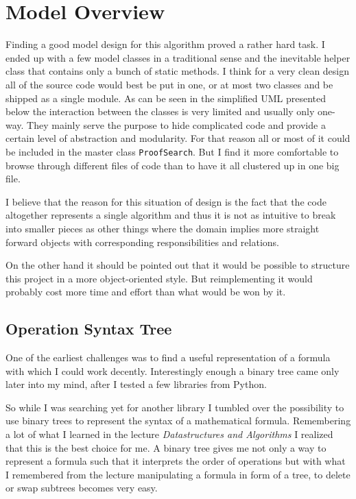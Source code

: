 \section{Model Overview}
Finding a good model design for this algorithm proved a rather hard task. I ended up with a few model classes in a traditional sense and the inevitable helper class that contains only a bunch of static methods. I think for a very clean design all of the source code would best be put in one, or at most two classes and be shipped as a single module. As can be seen in the simplified UML presented below the interaction between the classes is very limited and usually only one-way. They mainly serve the purpose to hide complicated code and provide a certain level of abstraction and modularity. For that reason all or most of it could be included in the master class \texttt{ProofSearch}. But I find it more comfortable to browse through different files of code than to have it all clustered up in one big file.

I believe that the reason for this situation of design is the fact that the code altogether represents a single algorithm and thus it is not as intuitive to break into smaller pieces as other things where the domain implies more straight forward objects with corresponding responsibilities and relations.

On the other hand it should be pointed out that it would be possible to structure this project in a more object-oriented style. But reimplementing it would probably cost more time and effort than what would be won by it.

\subsection{Operation Syntax Tree}
One of the earliest challenges was to find a useful representation of a formula with which I could work decently. Interestingly enough a binary tree came only later into my mind, after I tested a few libraries from Python. 

So while I was searching yet for another library I tumbled over the possibility to use binary trees to represent the syntax of a mathematical formula. Remembering a lot of what I learned in the lecture \emph{Datastructures and Algorithms} I realized that this is the best choice for me. A binary tree gives me not only a way to represent a formula such that it interprets the order of operations but with what I remembered from the lecture manipulating a formula in form of a tree, to delete or swap subtrees becomes very easy. 

